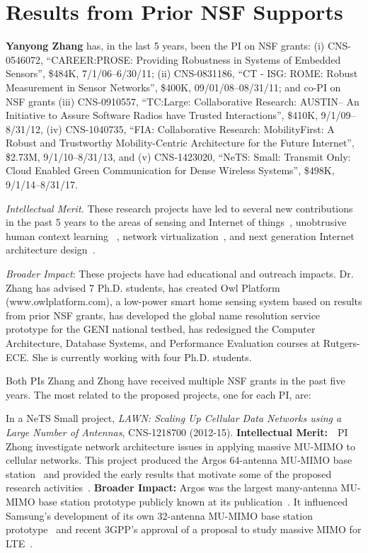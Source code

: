 \section{Results from Prior NSF Supports\label{sec:prior}}



\noindent \textbf{Yanyong Zhang} has, in the last 5 years, been the PI on NSF grants:
(i) CNS-0546072,  ``CAREER:PROSE: Providing Robustness in Systems of Embedded Sensors'', \$484K,  7/1/06--6/30/11;
(ii) CNS-0831186, ``CT - ISG: ROME: Robust Measurement in Sensor Networks'', \$400K, 09/01/08--08/31/11;
and co-PI on NSF grants
(iii) CNS-0910557, ``TC:Large: Collaborative Research: AUSTIN-- An Initiative to Assure Software Radios have Trusted Interactions'', \$410K, 9/1/09--8/31/12, (iv) CNS-1040735, ``FIA: Collaborative Research: MobilityFirst: A Robust and Trustworthy Mobility-Centric Architecture for the Future Internet'', \$2.73M, 9/1/10--8/31/13, and (v) CNS-1423020, ``NeTS: Small: Transmit Only: Cloud Enabled Green Communication for
Dense Wireless Systems'', \$498K, 9/1/14--8/31/17.

\emph{Intellectual Merit.} These research projects have led to several new contributions in the past 5 years to the areas of sensing and Internet of things~\cite{zan-etal:mdm10,sun2012association,sun2011improved,sun2012boomerang,moore2013building}, unobtrusive human context learning ~\cite{xu2012improving,xu2012towards,xu2013crowd++,xu2013scpl}, network virtualization~\cite{bhanage2011virtual,bhanage2011experimental}, and next generation Internet architecture design~\cite{vu2012dmap,sun2011improving,zhang2012content,liu2013secure,zhang2013using,li2013mobile,li2012popularity}.

\emph{Broader Impact}: These projects have had educational and outreach impacts. Dr. Zhang has advised 7 Ph.D. students,  has created Owl Platform (www.owlplatform.com), a low-power smart home sensing system based on results from prior NSF grants, has developed the global name resolution service prototype for the GENI national testbed, has redesigned the Computer Architecture, Database Systems, and Performance Evaluation courses at Rutgers-ECE. She is currently working with four Ph.D. students.



Both PIs Zhang and Zhong have received multiple NSF grants in the past five years. The most related to the proposed projects, one for each PI, are:

In a NeTS Small project, \emph{LAWN: Scaling Up Cellular Data Networks
  using a Large Number of Antennas}, CNS-1218700 (2012-15). {\bf Intellectual Merit:}~~PI Zhong
investigate
network architecture issues in applying massive MU-MIMO to cellular
networks. This project produced the Argos 64-antenna MU-MIMO base station~\cite{shepard2012mobicom} and provided the early
results that motivate some of the proposed research activities~\cite{shepard2013cellnet}. {\bf Broader Impact:} Argos was the largest many-antenna MU-MIMO base station prototype publicly known at its publication~\cite{shepard2012mobicom}. It influenced Samsung's development of its own 32-antenna MU-MIMO base station prototype~\cite{samsung2013fdmimo} and recent 3GPP's approval of a proposal to study massive MIMO for LTE~\cite{fdmimo}. %